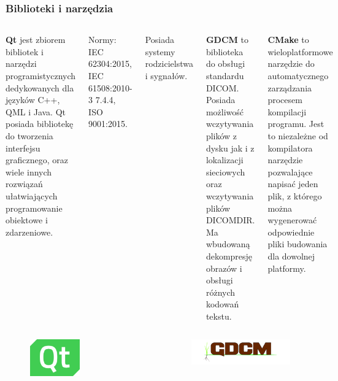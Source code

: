 \documentclass[aspectratio=169]{beamer}
\begin{document}
\begin{frame}[t]
    \frametitle{Biblioteki i narzędzia}

    \begin{columns}[t]
        \textbf{\LARGE Qt}
        \scriptsize
        jest zbiorem bibliotek i narzędzi programistycznych dedykowanych dla języków C++, QML i Java.
        Qt posiada bibliotekę do tworzenia interfejsu graficznego, oraz wiele innych rozwiązań ułatwiających programowanie obiektowe i zdarzeniowe.

        Normy: IEC 62304:2015, IEC 61508:2010-3 7.4.4, ISO 9001:2015.

        Posiada systemy rodzicielstwa i sygnałów.

        \textbf{\LARGE GDCM}
        \scriptsize
        to biblioteka do obsługi standardu DICOM.
        Posiada możliwość wczytywania plików z dysku jak i z lokalizacji sieciowych oraz wczytywania plików DICOMDIR.
        Ma wbudowaną dekompresję obrazów i obsługi różnych kodowań tekstu.

        \textbf{\LARGE CMake}
        \scriptsize
        to wieloplatformowe narzędzie do automatycznego zarządzania procesem kompilacji programu.
        Jest to niezależne od kompilatora narzędzie pozwalające napisać jeden plik, z którego można wygenerować odpowiednie pliki budowania dla dowolnej platformy.

    \end{columns}


    \begin{columns}[c]

        \begin{figure}
            \includegraphics[width=0.5\textwidth]{img/logo-qt.png}
        \end{figure}

        \begin{figure}
            \includegraphics[width=1\textwidth]{img/logo-gdcm.png}
        \end{figure}


\end{columns}
\end{frame}
\end{document}
